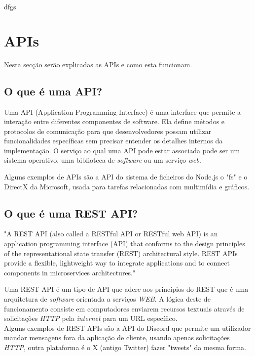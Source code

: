 dfgs

\section{APIs}

Nesta secção serão explicadas as APIs e como esta funcionam.


\subsection{O que é uma API?}

Uma API (Application Programming Interface) é uma interface que permite a interação entre diferentes componentes de software. 
Ela define métodos e protocolos de comunicação para que desenvolvedores possam utilizar 
funcionalidades específicas sem precisar entender os detalhes internos da implementação.
O serviço ao qual uma API pode estar associada pode ser um sistema operativo, uma biblioteca
de \textit{software} ou um serviço \textit{web}.

Alguns exemplos de APIs são a API do sistema de ficheiros do Node.js o "fs" e o DirectX 
da Microsoft, usada para tarefas relacionadas com multimídia e gráficos.

\subsection{O que é uma REST API?}


"A REST API (also called a RESTful API or RESTful web API) is an application 
programming interface (API) that conforms to the design principles of the representational
state transfer (REST) architectural style. REST APIs provide a flexible, lightweight way 
to integrate applications and to connect components in microservices architectures." \cite{ibmrestapi}



Uma REST API é um tipo de API que adere aos princípios do REST que é uma arquitetura
de \textit{software} orientada a serviços \textit{WEB}.
A lógica deste de funcionamento consiste em computadores enviarem recursos textuais através
de solicitações \textit{HTTP} pela \textit{internet} para um URL específico. \\

Alguns exemplos de REST APIs são a API do Discord que permite um utilizador mandar mensagens fora
da aplicação de cliente, usando apenas solicitações \textit{HTTP}, outra plataforma é 
o X (antigo Twitter) fazer "tweets" da mesma forma.


